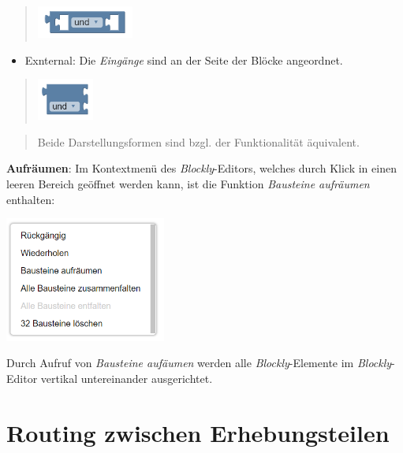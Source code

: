 \documentclass[
  letterpaper,
  DIV=11]{scrreprt}
\providecommand{\tightlist}{%
  \setlength{\itemsep}{0pt}\setlength{\parskip}{0pt}}\usepackage{longtable,booktabs,array}
\begin{document}
\begin{tcolorbox}
\begin{quote}
\includegraphics[width=1.25in,height=\textheight]{img/screenshot-blockly-element-logic-combine-internal-01-DEU.png}
\end{quote}

\begin{itemize}
\tightlist
\item
  Exnternal: Die \emph{Eingänge} sind an der Seite der Blöcke
  angeordnet.
\end{itemize}

\begin{quote}
\includegraphics[width=0.72917in,height=\textheight]{img/screenshot-blockly-element-logic-combine-external-01-DEU.png}
\end{quote}

\begin{quote}
Beide Darstellungsformen sind bzgl. der Funktionalität äquivalent.
\end{quote}

\textbf{Aufräumen}: Im Kontextmenü des \emph{Blockly}-Editors, welches
durch Klick in einen leeren Bereich geöffnet werden kann, ist die
Funktion \emph{Bausteine aufräumen} enthalten:

\includegraphics[width=2.08333in,height=\textheight]{img/screenshot-context-menu-blockly-editor-example01-DEU.png}

Durch Aufruf von \emph{Bausteine aufäumen} werden alle
\emph{Blockly}-Elemente im \emph{Blockly}-Editor vertikal untereinander
ausgerichtet.

\end{tcolorbox}

\hypertarget{routing-zwischen-erhebungsteilen-1}{%
\section{Routing zwischen
Erhebungsteilen}\label{routing-zwischen-erhebungsteilen-1}}
\end{document}
